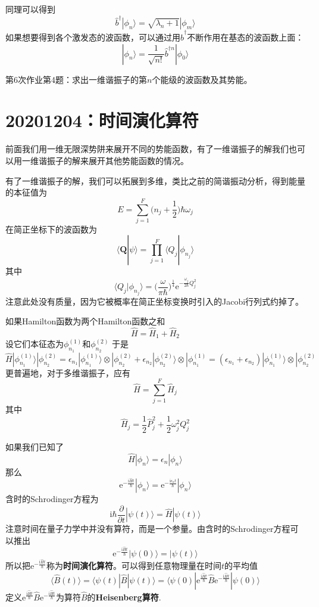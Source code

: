         同理可以得到
        \[ \hat{b}^\dagger|\phi_n\rangle = \sqrt{\lambda_n+1}|\phi_m\rangle \]
        如果想要得到各个激发态的波函数，可以通过用$\hat{b}^\dagger$不断作用在基态的波函数上面：
        \[ |\phi_n \rangle = \frac 1{\sqrt{n!}} \hat{b}^{\dagger n} | \phi_0 \rangle \]

        \begin{asg}
            第6次作业第4题：求出一维谐振子的第$n$个能级的波函数及其势能。
        \end{asg}

    \section{20201204：时间演化算符}
        前面我们用一维无限深势阱来展开不同的势能函数，有了一维谐振子的解我们也可以用一维谐振子的解来展开其他势能函数的情况。

        有了一维谐振子的解，我们可以拓展到多维，类比之前的简谐振动分析，得到能量的本征值为
        \[ E = \sum_{j=1}^F \bigg(n_j+\frac 12\bigg)\hbar \omega_j \]
        在简正坐标下的波函数为
        \[ \langle \bm{Q}|\psi \rangle = \prod_{j=1}^F \langle Q_j | \phi_{n_j} \rangle \]
        其中
        \[ \langle Q_j|\phi_{n_j} \rangle = \bigg(\frac {\omega}{\pi \hbar}\bigg)^{\frac 14} \mathrm{e}^{-\frac {\omega_j}{2\hbar} Q_j^2} \]
        注意此处没有质量，因为它被概率在简正坐标变换时引入的Jacobi行列式约掉了。

        如果Hamilton函数为两个Hamilton函数之和
        \[ \hat{H} = \hat{H}_1 + \hat{H}_2 \]
        设它们本征态为$\phi_{n_1}^{(1)}$和$\phi_{n_2}^{(2)}$
        于是
        \[\hat{H} |\phi_{n_1}^{(1)} \rangle |\phi_{n_2}^{(2)} = \epsilon_{n_1}|\phi_{n_1}^{(1)} \rangle \otimes |\phi_{n_2}^{(2)} + \epsilon_{n_2}|\phi_{n_2}^{(2)} \rangle \otimes |\phi_{n_1}^{(1)} = (\epsilon_{n_1}+\epsilon_{n_2})|\phi_{n_1}^{(1)} \rangle \otimes |\phi_{n_2}^{(2)}\]
        更普遍地，对于多维谐振子，应有
        \[ \hat{H} = \sum_{j=1}^F \hat{H}_j \]
        其中 
        \[ \hat{H}_j = \frac 12 \hat{P}_j^2 + \frac 12 \omega_j^2 Q_j^2 \]

        如果我们已知了
        \[ \hat{H}|\phi_n\rangle = \epsilon_n|\phi_n\rangle \]
        那么
        \[ \mathrm{e}^{-\frac {\mathrm{i}\hat{H}t}{\hbar}}|\phi_n\rangle = \mathrm{e}^{-\frac {\mathrm{i}\epsilon_n t}{\hbar}}|\phi_n\rangle \]
        含时的Schrodinger方程为
        \[ \mathrm{i}\hbar \frac {\partial}{\partial t}|\psi(t)\rangle = \hat{H} |\psi(t)\rangle \]
        注意时间在量子力学中并没有算符，而是一个参量。由含时的Schrodinger方程可以推出
        \[ \mathrm{e}^{-\frac {\mathrm{i}\hat{H}t}{\hbar}}|\psi(0)\rangle = |\psi(t) \rangle \]
        所以把$\mathrm{e}^{-\frac {\mathrm{i}\hat{H}t}{\hbar}}$称为\textbf{时间演化算符}。可以得到任意物理量在时间$t$的平均值 
        \[ \langle \hat{B}(t) \rangle = \langle \psi(t)|\hat{B} | \psi(t) \rangle = \langle \psi(0) |\mathrm{e}^{\frac {\mathrm{i}\hat{H}t}{\hbar}} \hat{B} \mathrm{e}^{-\frac {\mathrm{i}\hat{H}t}{\hbar}}|\psi(0) \rangle \]
        定义$\mathrm{e}^{\frac {\mathrm{i}\hat{H}t}{\hbar}} \hat{B} \mathrm{e}^{-\frac {\mathrm{i}\hat{H}t}{\hbar}}$为算符$\hat{B}$的\textbf{Heisenberg算符}.

